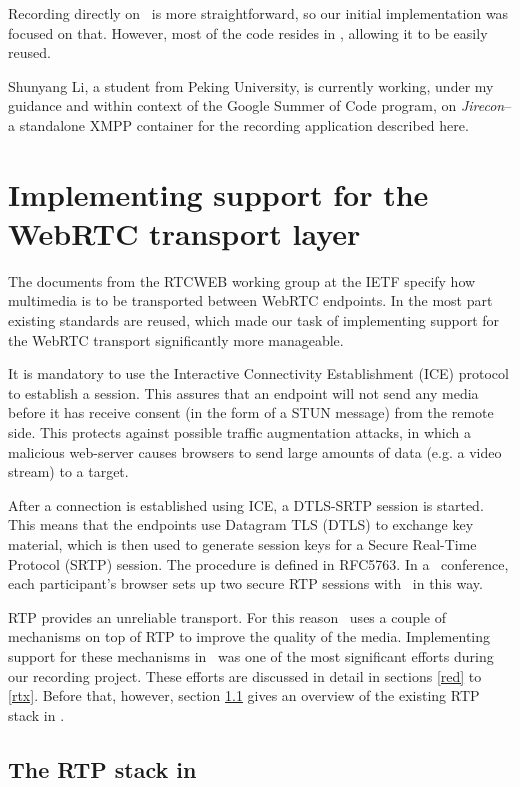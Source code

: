 \documentclass[twoside,openright,a4paper,12pt,english]{article}
\begin{document}
Recording directly on \jvb\ is more straightforward, so our initial
implementation was focused on that. However, most of the code resides in \lj, allowing
it to be easily reused.

Shunyang Li, a student from Peking University, is currently working, under my
guidance and within context of the Google Summer of Code program, on
\emph{Jirecon}\cite{jirecon}-- a standalone XMPP
container for the recording application described here.



\section{Implementing support for the WebRTC transport layer}
The documents from the RTCWEB working group at the IETF specify how multimedia
is to be transported between WebRTC endpoints. In the most part existing
standards are reused, which made our task of implementing support for the
WebRTC transport significantly more manageable.

It is mandatory to use the Interactive Connectivity Establishment (ICE\cite{ice}) protocol to
establish a session. This assures that an endpoint will not send any media
before it has receive consent (in the form of a STUN message) from the remote
side. This protects against possible traffic augmentation attacks, in which a malicious
web-server causes browsers to send large amounts of data (e.g. a video stream) to a
target.

After a connection is established using ICE, a DTLS-SRTP session is started.
This means that the endpoints use Datagram TLS (DTLS\cite{dtls})
to exchange key material, which is then used to generate session keys for a
Secure Real-Time Protocol (SRTP\cite{srtp})
session. The procedure is defined in RFC5763\cite{rfc5763}.
In a \jm\ conference, each participant's browser sets up two secure RTP sessions with
\jvb\ in this way.

\medskip
RTP provides an unreliable transport. For this reason \wrtc\ uses a couple of
mechanisms on top of RTP to improve the quality of the media.
Implementing support for these mechanisms in \lj\ was one of the most
significant efforts during our recording project. These efforts are
discussed in detail in sections \ref{red} to \ref{rtx}.
Before that, however, section \ref{lj} gives an overview of the existing RTP stack
in \lj.


\subsection{The RTP stack in \lj}
\label{lj}
\end{document}
